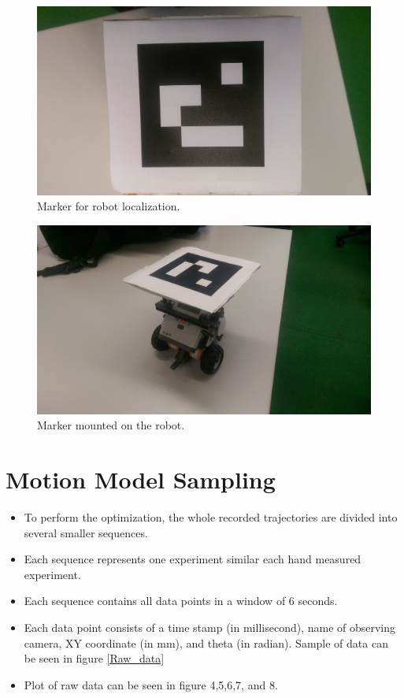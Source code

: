 \documentclass[paper=a4, fontsize=11pt]{scrartcl} %
\begin{document}
    \begin{figure}[H]
        \begin{center}
            \setlength{\fboxsep}{0.5pt} %
            \setlength{\fboxrule}{0.5pt}
            \includegraphics[width=12cm,fbox]{images/marker.jpg}
            \caption{Marker for robot localization.}
        \end{center}
    \end{figure}

    \begin{figure}[H]
        \begin{center}
            \setlength{\fboxsep}{0.5pt} %
            \setlength{\fboxrule}{0.5pt}
            \includegraphics[width=12cm,fbox]{images/marker_robot.jpg}
            \caption{Marker mounted on the robot.}
        \end{center}
    \end{figure}

\section{Motion Model Sampling}
    \begin{itemize}
        \item To perform the optimization, the whole recorded trajectories are divided into several smaller sequences.
        \item Each sequence represents one experiment similar each hand measured experiment.
        \item Each sequence contains all data points in a window of 6 seconds.
        \item Each data point consists of a time stamp (in millisecond), name of observing camera, XY coordinate (in mm), and theta (in radian). Sample of data can be seen in figure \ref{Raw_data}
        \item Plot of raw data can be seen in figure 4,5,6,7, and 8.
    \end{itemize}
\end{document}
